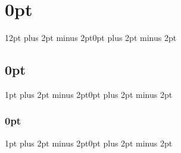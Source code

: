 \titlespacing\section{0pt}{12pt plus 2pt minus 2pt}{0pt plus 2pt minus 2pt}
\titlespacing\subsection{0pt}{1pt plus 2pt minus 2pt}{0pt plus 2pt minus 2pt}
\titlespacing\subsubsection{0pt}{1pt plus 2pt minus 2pt}{0pt plus 2pt minus 2pt}



\newcommand{\tocfont}{\normalsize}	%


\usepackage[portuges]{minitoc}
\nomtcrule

\setcounter{Examplecount}{0}

